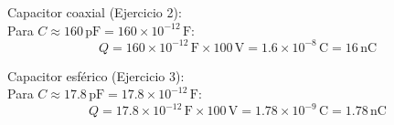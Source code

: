 \documentclass[answers]{exam} %
\begin{document}
\begin{questions}
        Capacitor coaxial (Ejercicio 2):\\
        Para \( C \approx 160 \, \text{pF} = 160 \times 10^{-12} \, \text{F} \):
        \[
        Q = 160 \times 10^{-12} \, \text{F} \times 100 \, \text{V} = 1.6 \times 10^{-8} \, \text{C} = 16 \, \text{nC}
        \]
        
        Capacitor esférico (Ejercicio 3):\\
        Para \( C \approx 17.8 \, \text{pF} = 17.8 \times 10^{-12} \, \text{F} \):
        \[
        Q = 17.8 \times 10^{-12} \, \text{F} \times 100 \, \text{V} = 1.78 \times 10^{-9} \, \text{C} = 1.78 \, \text{nC}
        \]
        
      
        

\end{questions}
\end{document}
